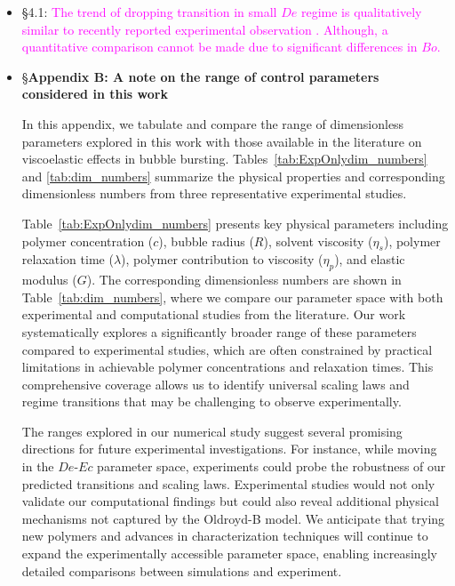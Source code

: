 \documentclass[]{article}
\newcommand{\rev}[1]{{\textcolor{magenta}{#1}}}
\begin{document}
\begin{enumerate}
\begin{itemize}
	\item 
	\S4.1: \rev{The trend of dropping transition in small $De$ regime is qualitatively similar to recently reported experimental observation \citep{cabalganteeffect}. Although, a quantitative comparison cannot be made due to significant differences in $Bo$. }

\item 
	\S \textbf{Appendix B: A note on the range of control parameters considered in this work}
	
	In this appendix, we tabulate and compare the range of dimensionless parameters explored in this work with those available in the literature on viscoelastic effects in bubble bursting. Tables~\ref{tab:ExpOnlydim_numbers} and \ref{tab:dim_numbers} summarize the physical properties and corresponding dimensionless numbers from three representative experimental studies.
	
		Table~\ref{tab:ExpOnlydim_numbers} presents key physical parameters including polymer concentration ($c$), bubble radius ($R$), solvent viscosity ($\eta_s$), polymer relaxation time ($\lambda$), polymer contribution to viscosity ($\eta_p$), and elastic modulus ($G$). The corresponding dimensionless numbers are shown in Table~\ref{tab:dim_numbers}, where we compare our parameter space with both experimental and computational studies from the literature. Our work systematically explores a significantly broader range of these parameters compared to experimental studies, which are often constrained by practical limitations in achievable polymer concentrations and relaxation times. This comprehensive coverage allows us to identify universal scaling laws and regime transitions that may be challenging to observe experimentally.
	
	The ranges explored in our numerical study suggest several promising directions for future experimental investigations. For instance, while moving in the $De$-$Ec$ parameter space, experiments could probe the robustness of our predicted transitions and scaling laws. Experimental studies would not only validate our computational findings but could also reveal additional physical mechanisms not captured by the Oldroyd-B model. We anticipate that trying new polymers and advances in characterization techniques \citep{gaillard2024beware} will continue to expand the experimentally accessible parameter space, enabling increasingly detailed comparisons between simulations and experiment.
	

\end{itemize}
\end{enumerate}
\end{document}

